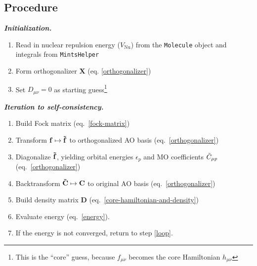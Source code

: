 \documentclass[11pt]{article}
\newcommand{\linl}[1]{\lstinline{#1}{}}
\newcommand{\ev}{\epsilon}   %
\newcommand{\tl}{\ensuremath{\tilde}}
\newcommand{\bmit}[1]{{\bfseries\itshape\mathversion{bold}#1}}
\newcommand{\bo}[1]{\ensuremath{\mathbf{#1}}}
\begin{document}
\subsection*{Procedure}

\bmit{Initialization.}
\begin{enumerate}
  \item Read in nuclear repulsion energy ($V_\mathrm{Nu}$) from the \linl{Molecule} object and integrals from \linl{MintsHelper}
  \item Form orthogonalizer $\bo{X}$ (eq. \ref{orthogonalizer})
  \item Set $D_{\mu\nu}=0$ as starting guess\footnote{This is the ``core'' guess, because $f_{\mu\nu}$ becomes the core Hamiltonian $h_{\mu\nu}$}
\end{enumerate}

\noindent
\bmit{Iteration to self-consistency.}
\begin{enumerate}
  \item\label{loop} Build Fock matrix (eq.~\ref{fock-matrix})
  \item Transform $\bo{f}\mapsto\bo{\tl{f}}$ to orthogonalized AO basis (eq.~\ref{orthogonalizer})
  \item Diagonalize $\bo{\tl{f}}$, yielding orbital energies $\ev_p$ and MO coefficients $\tl{C}_{\mu p}$ (eq.~\ref{orthogonalizer})
  \item Backtransform $\bo{\tl{C}}\mapsto\bo{C}$ to original AO basis (eq.~\ref{orthogonalizer})
  \item Build density matrix $\bo{D}$ (eq.~\ref{core-hamiltonian-and-density})
  \item Evaluate energy (eq.~\ref{energy}).
  \item If the energy is not converged, return to step \ref{loop}.
\end{enumerate}
\end{document}
